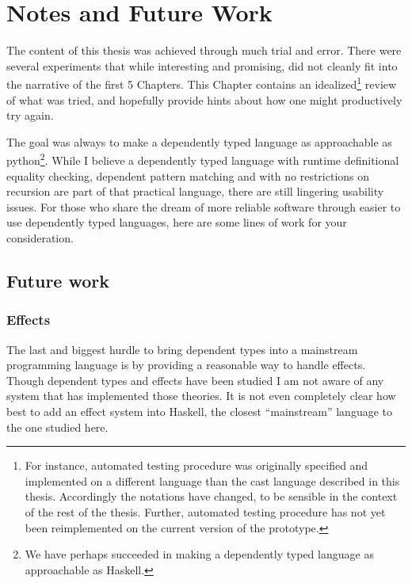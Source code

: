 \chapter{Notes and Future Work}
\label{chapter:Notes}
\thispagestyle{myheadings}
 
The content of this thesis was achieved through much trial and error.
There were several experiments that while interesting and promising, did not cleanly fit into the narrative of the first 5 Chapters.
This Chapter contains an idealized\footnote{
  For instance, automated testing procedure was originally specified and implemented on a different language than the cast language described in this thesis.
  Accordingly the notations have changed, to be sensible in the context of the rest of the thesis. %
  Further, automated testing procedure has not yet been reimplemented on the current version of the prototype.
} review of what was tried, and hopefully provide hints about how one might productively try again.
 
The goal was always to make a dependently typed language as approachable as python\footnote{We have perhaps succeeded in making a dependently typed language as approachable as Haskell.}.
While I believe a \fullSp{} dependently typed language with runtime definitional equality checking, dependent pattern matching and with no restrictions on recursion are part of that practical language, there are still lingering usability issues.
For those who share the dream of more reliable software through easier to use dependently typed languages, here are some lines of work for your consideration.

 


\section{Future work}


\subsection{Effects}

The last and biggest hurdle to bring dependent types into a mainstream programming language is by providing a reasonable way to handle effects.
Though dependent types and effects have been studied I am not aware of any \fullSp{} system that has implemented those theories.
It is not even completely clear how best to add an effect system into Haskell, the closest ``mainstream'' language to the one studied here.

